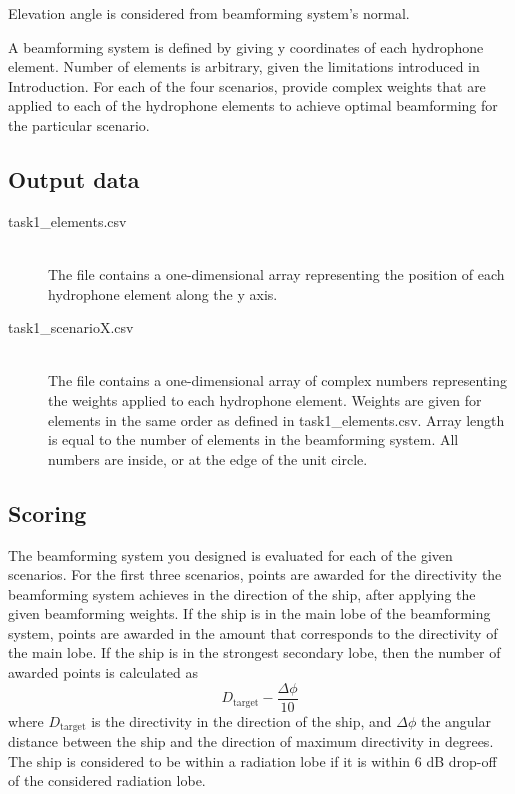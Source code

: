 \documentclass{article}[a4paper]
\begin{document}
Elevation angle is considered from beamforming system's normal.

A beamforming system is defined by giving y coordinates of each hydrophone element. Number of elements is arbitrary, given the limitations introduced in Introduction. For each of the four scenarios, provide complex weights that are applied to each of the hydrophone elements to achieve optimal beamforming for the particular scenario.

\subsection*{Output data}

\begin{description}
	\item[task1\_elements.csv] \,\\ The file contains a one-dimensional array representing the position of each hydrophone element along the y axis.
	\item[task1\_scenarioX.csv] \,\\ The file contains a one-dimensional array of complex numbers representing the weights applied to each hydrophone element. Weights are given for elements in the same order as defined in task1\_elements.csv. Array length is equal to the number of elements in the beamforming system. All numbers are inside, or at the edge of the unit circle.
\end{description}

\subsection*{Scoring}

The beamforming system you designed is evaluated for each of the given scenarios. For the first three scenarios, points are awarded for the directivity the beamforming system achieves in the direction of the ship, after applying the given beamforming weights. If the ship is in the main lobe of the beamforming system, points are awarded in the amount that corresponds to the directivity of the main lobe. If the ship is in the strongest secondary lobe, then the number of awarded points is calculated as
\[ D_\textrm{target} - \dfrac{\varDelta \phi}{10} \]
where $D_\textrm{target}$ is the directivity in the direction of the ship, and $\varDelta \phi$ the angular distance between the ship and the direction of maximum directivity in degrees. The ship is considered to be within a radiation lobe if it is within 6 dB drop-off of the considered radiation lobe.
\end{document}
